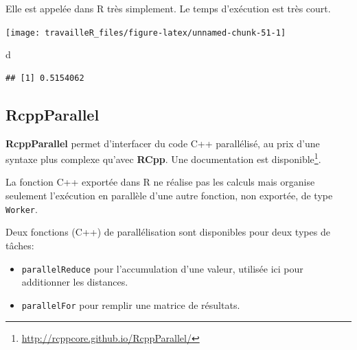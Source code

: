 \documentclass[
  12pt,
  french,
  a4paper,
  extrafontsizes,onecolumn,openright
  ]{memoir}
\newenvironment{Shaded}{\begin{snugshade}}{\end{snugshade}}
\newcommand{\CommentTok}[1]{\textcolor[rgb]{0.56,0.35,0.01}{\textit{#1}}}
\newcommand{\KeywordTok}[1]{\textcolor[rgb]{0.13,0.29,0.53}{\textbf{#1}}}
\newcommand{\NormalTok}[1]{#1}
\newcommand{\OperatorTok}[1]{\textcolor[rgb]{0.81,0.36,0.00}{\textbf{#1}}}
\newcommand{\StringTok}[1]{\textcolor[rgb]{0.31,0.60,0.02}{#1}}
\providecommand{\tightlist}{%
  \setlength{\itemsep}{0pt}\setlength{\parskip}{0pt}}
\newlength{\rf}
\begin{document}
\normalsize

Elle est appelée dans R très simplement.
Le temps d'exécution est très court.

\scriptsize

\begin{Shaded}
\end{Shaded}

\begin{center}\texttt{[image: travailleR\_files/figure-latex/unnamed-chunk-51-1]} \end{center}

\begin{Shaded}
\begin{Highlighting}[]
\NormalTok{d}
\end{Highlighting}
\end{Shaded}

\begin{verbatim}
## [1] 0.5154062
\end{verbatim}

\normalsize

\hypertarget{rcppparallel}{%
\subsection{RcppParallel}\label{rcppparallel}}

\textbf{RcppParallel} permet d'interfacer du code C++ parallélisé, au prix d'une syntaxe plus complexe qu'avec \textbf{RCpp}.
Une documentation est disponible\footnote{\url{http://rcppcore.github.io/RcppParallel/}}.

La fonction C++ exportée dans R ne réalise pas les calculs mais organise seulement l'exécution en parallèle d'une autre fonction, non exportée, de type \texttt{Worker}.

Deux fonctions (C++) de parallélisation sont disponibles pour deux types de tâches:

\begin{itemize}
\tightlist
\item
  \texttt{parallelReduce} pour l'accumulation d'une valeur, utilisée ici pour additionner les distances.
\item
  \texttt{parallelFor} pour remplir une matrice de résultats.
\end{itemize}
\end{document}
